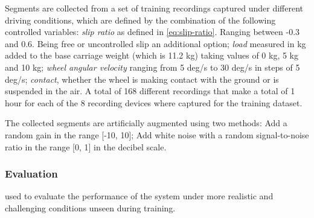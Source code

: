 Segments are collected from a set of training recordings captured under
different driving conditions, which are defined by the combination of the
following controlled variables: \emph{slip ratio} as defined in
\cref{eq:slip-ratio}. Ranging between -0.3 and 0.6. Being free or uncontrolled
slip an additional option; \emph{load} measured in kg added to the base
carriage weight (which is 11.2 kg) taking values of 0 kg, 5 kg and 10 kg;
\emph{wheel angular velocity} ranging from 5 deg/s to 30 deg/s in steps of 5
deg/s; \emph{contact}, whether the wheel is making contact with the ground or
is suspended in the air. A total of 168 different recordings that make a total
of 1 hour for each of the 8 recording devices where captured for the training
dataset.



The collected segments are artificially augmented using two methods: Add a
random gain in the range [-10, 10]; Add white noise with a random
signal-to-noise ratio in the range [0, 1] in the decibel scale.

\subsubsection{Evaluation}
used to evaluate the performance of the system under more realistic and
challenging conditions unseen during training. 

